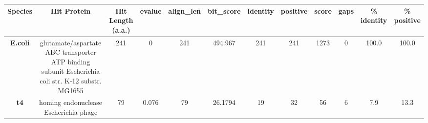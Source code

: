 \begin{tabular}{|c|c|c|c|c|c|c|c|c|c|c|c|} \hline
\textbf{Species} & \textbf{Hit Protein} & \textbf{Hit Length (a.a.)} & \textbf{evalue} & \textbf{align\_len} & \textbf{bit\_score} & \textbf{identity} & \textbf{positive} & \textbf{score} & \textbf{gaps} & \textbf{\% identity} & \textbf{\% positive} \\ \hline
\textbf{E.coli} & glutamate/aspartate ABC transporter ATP binding subunit Escherichia coli str. K-12 substr. MG1655 & 241 & 0 & 241 & 494.967 & 241 & 241 & 1273 & 0 & 100.0 & 100.0\\
\textbf{t4} & homing endonuclease Escherichia phage  & 79 & 0.076 & 79 & 26.1794 & 19 & 32 & 56 & 6 & 7.9 & 13.3\\
\hline \end{tabular}
